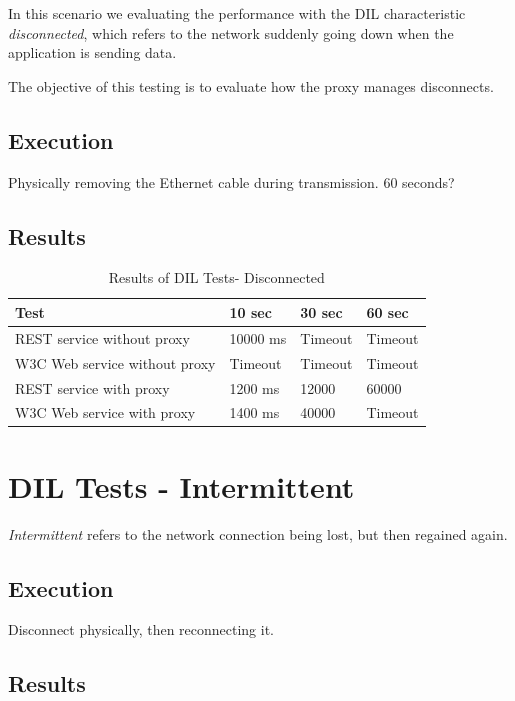 In this scenario we evaluating the performance with the DIL characteristic
\textit{disconnected}, which refers to the network suddenly going down when the
application is sending data.

The objective of this testing is to evaluate how the proxy manages disconnects.

\subsection{Execution}

Physically removing the Ethernet cable during transmission. 60 seconds?

\subsection{Results}
\begin{table}[h]
\begin{tabular}{| l | l | l | l |}
\hline
  \textbf{Test} & \textbf{10 sec} & \textbf{30 sec} & \textbf{60 sec} \\ \hline
  REST service without proxy & 10000 ms & Timeout & Timeout \\ \hline
  W3C Web service without proxy & Timeout & Timeout & Timeout \\ \hline
  REST service with proxy & 1200 ms & 12000 & 60000 \\ \hline
  W3C Web service with proxy & 1400 ms & 40000 & Timeout \\ \hline
\end{tabular}
\caption{Results of DIL Tests- Disconnected}
\end{table}

\section{DIL Tests - Intermittent}

\textit{Intermittent} refers to the network connection being lost, but then regained again.

\subsection{Execution}

Disconnect physically, then reconnecting it.

\subsection{Results}

